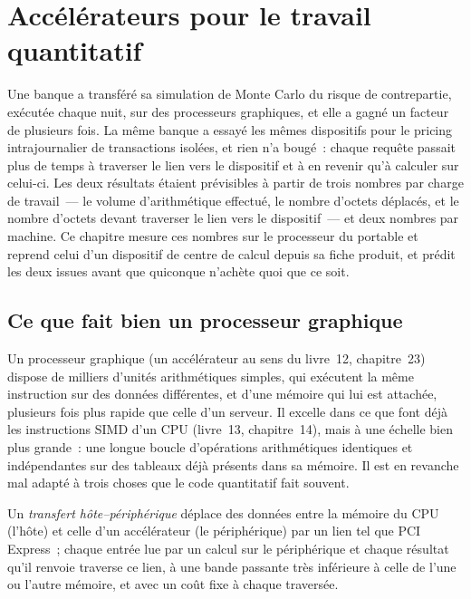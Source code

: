 \chapter{Accélérateurs pour le travail quantitatif}\label{ch:pl:accelerators-for-quantitative-work}

Une banque a transféré sa simulation de Monte Carlo du risque de contrepartie, exécutée chaque nuit, sur des processeurs graphiques, et elle a gagné un facteur de plusieurs fois. La même banque a essayé les
mêmes dispositifs pour le pricing intrajournalier de transactions isolées, et rien n'a bougé~: chaque requête passait plus de temps à traverser le lien vers le dispositif et à en revenir
qu'à calculer sur celui-ci. Les deux résultats étaient prévisibles à partir de trois nombres par charge de travail~--- le volume d'arithmétique effectué, le nombre d'octets
déplacés, et le nombre d'octets devant traverser le lien vers le dispositif~--- et deux nombres par machine. Ce chapitre mesure ces nombres sur le processeur du portable
et reprend celui d'un dispositif de centre de calcul depuis sa fiche produit, et prédit les deux issues avant que quiconque n'achète quoi que ce soit.

\section{Ce que fait bien un processeur graphique}

Un processeur graphique (un accélérateur au sens du livre~12, chapitre~23) dispose de milliers d'unités arithmétiques simples, qui exécutent la même
instruction sur des données différentes, et d'une mémoire qui lui est attachée, plusieurs fois plus rapide que celle d'un serveur. Il excelle dans ce que font déjà les
instructions SIMD d'un CPU (livre~13, chapitre~14), mais à une échelle bien plus grande~: une longue boucle d'opérations arithmétiques identiques et indépendantes sur des
tableaux déjà présents dans sa mémoire. Il est en revanche mal adapté à trois choses que le code quantitatif fait souvent.

\begin{definition}\label{def:pl:accelerators-for-quantitative-work:transfer}
Un \emph{transfert hôte--périphérique} déplace des données entre la mémoire du CPU (l'hôte) et celle d'un accélérateur
(le périphérique) par un lien tel que PCI Express~; chaque entrée lue par un calcul sur le périphérique et chaque résultat qu'il renvoie traverse ce lien, à
une bande passante très inférieure à celle de l'une ou l'autre mémoire, et avec un coût fixe à chaque traversée.
\end{definition}


